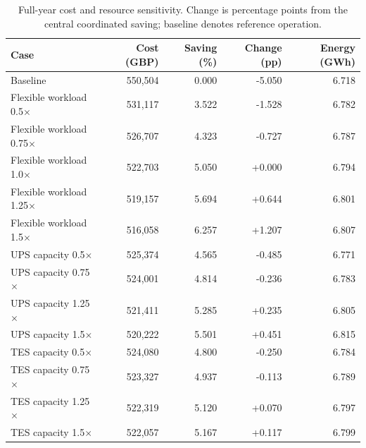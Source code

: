 \begin{table}[htbp]
\centering\small
\caption{Full-year cost and resource sensitivity. Change is percentage points from the central coordinated saving; baseline denotes reference operation.}\label{tab:annual-endpoints}
\begin{tabular}{@{}lrrrr@{}}\toprule
Case & Cost (GBP) & Saving (\%) & Change (pp) & Energy (GWh) \\\midrule
Baseline & 550,504 & 0.000 & -5.050 & 6.718 \\
Flexible workload 0.5$\times$ & 531,117 & 3.522 & -1.528 & 6.782 \\
Flexible workload 0.75$\times$ & 526,707 & 4.323 & -0.727 & 6.787 \\
Flexible workload 1.0$\times$ & 522,703 & 5.050 & +0.000 & 6.794 \\
Flexible workload 1.25$\times$ & 519,157 & 5.694 & +0.644 & 6.801 \\
Flexible workload 1.5$\times$ & 516,058 & 6.257 & +1.207 & 6.807 \\
UPS capacity 0.5$\times$ & 525,374 & 4.565 & -0.485 & 6.771 \\
UPS capacity 0.75$\times$ & 524,001 & 4.814 & -0.236 & 6.783 \\
UPS capacity 1.25$\times$ & 521,411 & 5.285 & +0.235 & 6.805 \\
UPS capacity 1.5$\times$ & 520,222 & 5.501 & +0.451 & 6.815 \\
TES capacity 0.5$\times$ & 524,080 & 4.800 & -0.250 & 6.784 \\
TES capacity 0.75$\times$ & 523,327 & 4.937 & -0.113 & 6.789 \\
TES capacity 1.25$\times$ & 522,319 & 5.120 & +0.070 & 6.797 \\
TES capacity 1.5$\times$ & 522,057 & 5.167 & +0.117 & 6.799 \\
\bottomrule\end{tabular}
\end{table}
